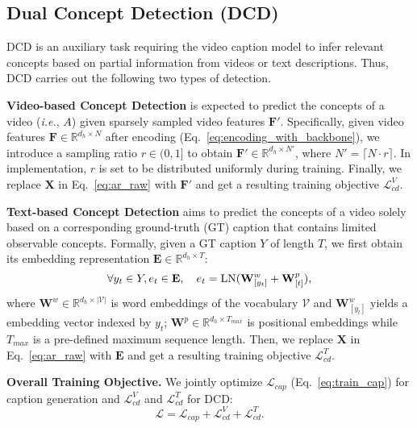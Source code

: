 \documentclass[runningheads]{llncs}
\newcommand\ie{\textit{i.e.}}
\begin{document}
\subsection{Dual Concept Detection (DCD)}
\label{sec:approach_DCD}
DCD is an auxiliary task requiring the video caption model to infer relevant concepts based on partial information from videos or text descriptions. Thus, DCD carries out the following two types of detection.

\noindent\textbf{Video-based Concept Detection} is expected to predict the concepts of a video (\ie{}, $A$) given sparsely sampled video features $\mathbf{F'}$. Specifically, given video features $\mathbf{F} \in \mathbb{R}^{d_h\times N}$ after encoding (Eq.~\ref{eq:encoding_with_backbone}), we introduce a sampling ratio $r \in (0, 1]$ to obtain $\mathbf{F'} \in \mathbb{R}^{d_h\times N'}$, where $N' = \lceil N\cdot r \rceil$. In implementation, $r$ is set to be distributed uniformly during training. Finally, we replace $\mathbf{X}$ in Eq.~\ref{eq:ar_raw} with $\mathbf{F'}$ and get a resulting training objective $\mathcal{L}^{V}_{cd}$.

\noindent\textbf{Text-based Concept Detection} aims to predict the concepts of a video solely based on a corresponding ground-truth (GT) caption that contains limited observable concepts. Formally, given a GT caption $Y$ of length $T$, we first obtain its embedding representation $\mathbf{E} \in \mathbb{R}^{d_h\times T}$:
\begin{equation}
\label{eq:AR_T}
\forall y_t \in Y, e_t \in \mathbf{E},\quad e_t = {\rm LN}(\mathbf{W}^{w}_{[y_t]} + \mathbf{W}^{p}_{[t]}),
\end{equation}
where $\mathbf{W}^{w} \in \mathbb{R}^{d_h\times |\mathcal{V}|}$ is word embeddings of the vocabulary $\mathcal{V}$ and $\mathbf{W}^{w}_{[y_t]}$ yields a embedding vector indexed by $y_t$; $\mathbf{W}^{p} \in \mathbb{R}^{d_h\times T_{max}}$ is positional embeddings while $T_{max}$ is a pre-defined maximum sequence length. Then, we replace $\mathbf{X}$ in Eq.~\ref{eq:ar_raw} with $\mathbf{E}$ and get a resulting training objective $\mathcal{L}^{T}_{cd}$. 

\noindent\textbf{Overall Training Objective.} We jointly optimize $\mathcal{L}_{cap}$ (Eq.~\ref{eq:train_cap}) for caption generation and $\mathcal{L}^{V}_{cd}$ and $\mathcal{L}^{T}_{cd}$ for DCD:
\begin{equation}
\label{eq:overall_objective}
    \mathcal{L} = \mathcal{L}_{cap} + \mathcal{L}^{V}_{cd} + \mathcal{L}^{T}_{cd}.
\end{equation}
\end{document}
